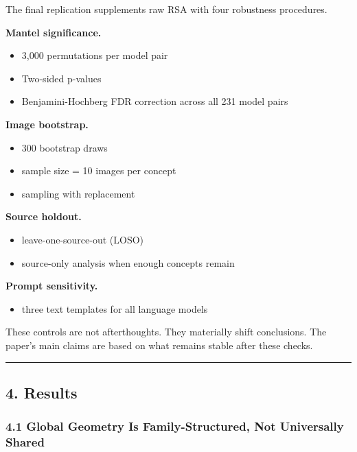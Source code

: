 \documentclass[
]{article}
\providecommand{\tightlist}{%
  \setlength{\itemsep}{0pt}\setlength{\parskip}{0pt}}
\begin{document}
The final replication supplements raw RSA with four robustness
procedures.

\textbf{Mantel significance.}

\begin{itemize}
\tightlist
\item
  3,000 permutations per model pair
\item
  Two-sided p-values
\item
  Benjamini-Hochberg FDR correction across all 231 model pairs
\end{itemize}

\textbf{Image bootstrap.}

\begin{itemize}
\tightlist
\item
  300 bootstrap draws
\item
  sample size = 10 images per concept
\item
  sampling with replacement
\end{itemize}

\textbf{Source holdout.}

\begin{itemize}
\tightlist
\item
  leave-one-source-out (LOSO)
\item
  source-only analysis when enough concepts remain
\end{itemize}

\textbf{Prompt sensitivity.}

\begin{itemize}
\tightlist
\item
  three text templates for all language models
\end{itemize}

These controls are not afterthoughts. They materially shift conclusions.
The paper's main claims are based on what remains stable after these
checks.

\begin{center}\rule{0.5\linewidth}{0.5pt}\end{center}

\subsection{4. Results}\label{results}

\subsubsection{4.1 Global Geometry Is Family-Structured, Not Universally
Shared}\label{global-geometry-is-family-structured-not-universally-shared}
\end{document}
